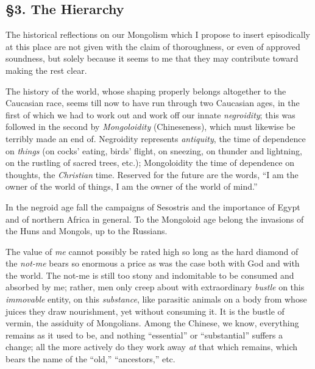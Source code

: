 \medskip{}

\subsection[\S{}3. The Hierarchy]{\centering \S{}3. The Hierarchy}

The historical reflections on our Mongolism which I propose to insert 
episodically at this place are not given with the claim of thoroughness, or 
even of approved soundness, but solely because it seems to me that they may 
contribute toward making the rest clear.

The history of the world, whose shaping properly belongs altogether to the 
Caucasian race, seems till now to have run through two Caucasian ages, in the 
first of which we had to work out and work off our innate \textit{negroidity}; 
this was followed in the second by \textit{Mongoloidity} (Chineseness), which 
must likewise be terribly made an end of. Negroidity represents 
\textit{antiquity}, the time of dependence on \textit{things} (on cocks' 
eating, birds' flight, on sneezing, on thunder and lightning, on the rustling 
of sacred trees, etc.); Mongoloidity the time of dependence on thoughts, the 
\textit{Christian} time. Reserved for the future are the words, ``I am the 
owner of the world of things, I am the owner of the world of mind.''

In the negroid age fall the campaigns of Sesostris and the importance of Egypt 
and of northern Africa in general. To the Mongoloid age belong the invasions 
of the Huns and Mongols, up to the Russians.

The value of \textit{me} cannot possibly be rated high so long as the hard 
diamond of the \textit{not-me} bears so enormous a price as was the case both 
with God and with the world. The not-me is still too stony and indomitable to 
be consumed and absorbed by me; rather, men only creep about with 
extraordinary \textit{bustle} on this \textit{immovable} entity, on this 
\textit{substance}, like parasitic animals on a body from whose juices they 
draw nourishment, yet without consuming it. It is the bustle of vermin, the 
assiduity of Mongolians. Among the Chinese, we know, everything remains as it 
used to be, and nothing ``essential'' or ``substantial'' suffers a change; 
all the more actively do they work away \textit{at} that which remains, which 
bears the name of the ``old,'' ``ancestors,'' etc.

